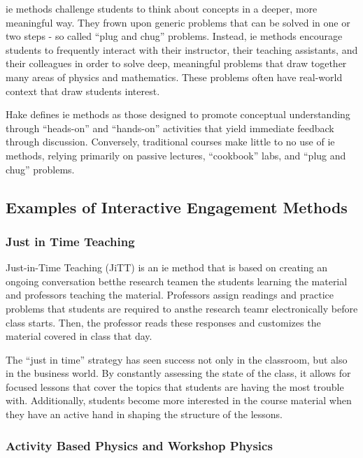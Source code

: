 \gls{ie} methods challenge students to think about concepts in a deeper, more meaningful way. They frown upon generic problems that can be solved in one or two steps - so called ``plug and chug'' problems. Instead, \gls{ie} methods encourage students to frequently interact with their instructor, their teaching assistants, and their colleagues in order to solve deep, meaningful problems that draw together many areas of physics and mathematics. These problems often have real-world context that draw students interest.

Hake defines \gls{ie} methods as those designed to promote conceptual understanding through ``heads-on'' and ``hands-on'' activities that yield immediate feedback through discussion. Conversely, traditional courses make little to no use of \gls{ie} methods, relying primarily on passive lectures, ``cookbook'' labs, and ``plug and chug'' problems.

\subsection{Examples of Interactive Engagement Methods}

\subsubsection{Just in Time Teaching}

Just-in-Time Teaching (JiTT) is an \gls{ie} method that is based on creating an ongoing conversation betthe research teamen the students learning the material and professors teaching the material. Professors assign readings and practice problems that students are required to ansthe research teamr electronically before class starts. Then, the professor reads these responses and customizes the material covered in class that day\cite{novak1999}.

The ``just in time'' strategy has seen success not only in the classroom, but also in the business world. By constantly assessing the state of the class, it allows for focused lessons that cover the topics that students are having the most trouble with. Additionally, students become more interested in the course material when they have an active hand in shaping the structure of the lessons.

\subsubsection{Activity Based Physics and Workshop Physics}

